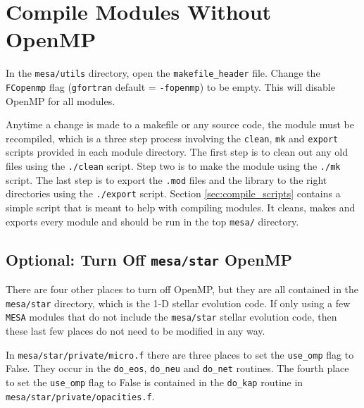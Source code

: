 \section{Compile Modules Without OpenMP}
\label{sec:compile_wo_omp}

In the {\tt mesa/utils} directory, open the {\tt makefile\_header} file. 
Change the {\tt FCopenmp} flag ({\tt gfortran} default = {\tt -fopenmp}) to 
be empty. This will disable OpenMP for all modules. 

Anytime a change is made to a makefile or any source code, the module must 
be recompiled, which is a three step process involving the {\tt clean}, 
{\tt mk} and {\tt export} scripts provided in each module directory. The 
first step is to clean out any old files using the {\tt ./clean} script. 
Step two is to make the module using the {\tt ./mk} script. The last step is 
to export the {\tt .mod} files and the library to the right directories using 
the {\tt ./export} script. Section \ref{sec:compile_scripts} contains a 
simple script that is meant to help with compiling modules. It cleans, makes 
and exports every module and should be run in the top {\tt mesa/} directory.

\subsection{Optional: Turn Off {\tt mesa/star} OpenMP}
There are four other places to turn off OpenMP, but they are all contained 
in the {\tt mesa/star} directory, which is the 1-D stellar evolution code. If 
only using a few {\tt MESA} modules that do not include the {\tt mesa/star} 
stellar evolution code, then these last few places do not need to be 
modified in any way. 

In {\tt mesa/star/private/micro.f} there are three places 
to set the {\tt use\_omp} flag to False. They occur in the {\tt do\_eos}, 
{\tt do\_neu} and {\tt do\_net} routines. The fourth place to set the 
{\tt use\_omp} flag to False is contained in the {\tt do\_kap} routine in 
{\tt mesa/star/private/opacities.f}.

